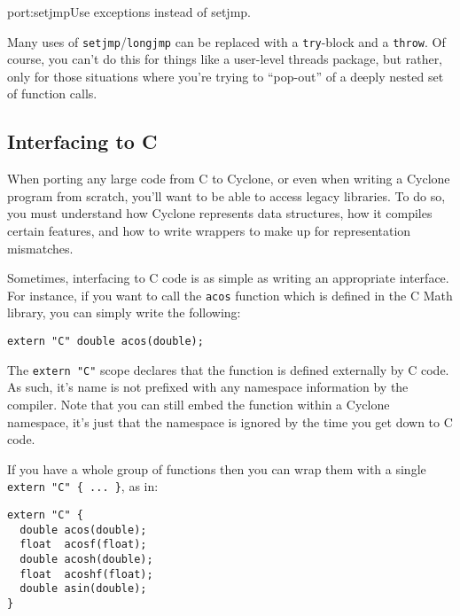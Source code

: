 \begin{porta}{port:setjmp}{Use exceptions instead of setjmp.}

Many uses of \texttt{setjmp}/\texttt{longjmp} can be replaced
with a \texttt{try}-block and a \texttt{throw}.  Of course,
you can't do this for things like a user-level threads package,
but rather, only for those situations where you're trying
to ``pop-out'' of a deeply nested set of function calls.
\end{porta}

\subsection{Interfacing to C}

When porting any large code from C to Cyclone, or even when writing
a Cyclone program from scratch, you'll want to be able to access
legacy libraries.  To do so, you must understand how Cyclone
represents data structures, how it compiles certain features,
and how to write wrappers to make up for representation mismatches.

Sometimes, interfacing to C code is as simple as writing
an appropriate interface.  For instance, if you want to
call the \texttt{acos} function which is defined in the C
Math library, you can simply write the following:
\begin{verbatim}
extern "C" double acos(double);
\end{verbatim}
The \texttt{extern "C"} scope declares that the function is
defined externally by C code.  As such, it's name is not
prefixed with any namespace information by the compiler.
Note that you can still embed the function within a Cyclone
namespace, it's just that the namespace is ignored by the
time you get down to C code.  

If you have a whole group of functions then you can wrap them with
a single \texttt{extern "C" \{ ... \}}, as in:
\begin{verbatim}
extern "C" {
  double acos(double);
  float  acosf(float);
  double acosh(double);
  float  acoshf(float);
  double asin(double);
}
\end{verbatim}

